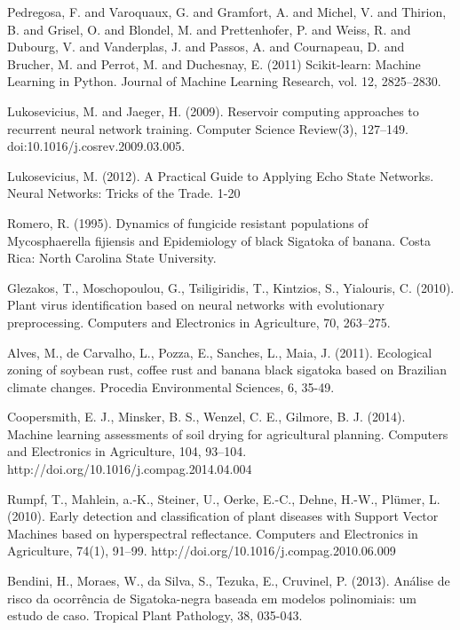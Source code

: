 \documentclass[review]{elsarticle}
\begin{document}
\begin{thebibliography}{1}
 Pedregosa, F. and Varoquaux, G. and Gramfort, A. and Michel, V. and Thirion, B. and Grisel, O. and Blondel, M. and Prettenhofer, P. and Weiss, R. and Dubourg, V. and Vanderplas, J. and Passos, A. and Cournapeau, D. and Brucher, M. and Perrot, M. and Duchesnay, E. (2011) Scikit-learn: Machine Learning in Python. Journal of Machine Learning Research, vol. 12, 2825--2830.

 Lukosevicius, M. and Jaeger, H. (2009). Reservoir computing approaches to recurrent neural network training. Computer Science Review(3), 127–149. doi:10.1016/j.cosrev.2009.03.005.

 Lukosevicius, M. (2012). A Practical Guide to Applying Echo State Networks. Neural Networks: Tricks of the Trade. 1-20

  Romero, R. (1995). Dynamics of fungicide resistant populations of Mycosphaerella fijiensis and Epidemiology of black Sigatoka of banana. Costa Rica: North Carolina State University.

 Glezakos, T., Moschopoulou, G., Tsiligiridis, T., Kintzios, S., Yialouris, C. (2010). Plant virus identification based on neural networks with evolutionary preprocessing. Computers and Electronics in Agriculture, 70, 263–275.

 Alves, M., de Carvalho, L., Pozza, E., Sanches, L., Maia, J. (2011). Ecological zoning of soybean rust, coffee rust and banana black sigatoka based on Brazilian climate changes. Procedia Environmental Sciences, 6, 35-49.

 Coopersmith, E. J., Minsker, B. S., Wenzel, C. E., Gilmore, B. J. (2014). Machine learning assessments of soil drying for agricultural planning. Computers and Electronics in Agriculture, 104, 93–104. http://doi.org/10.1016/j.compag.2014.04.004

 Rumpf, T., Mahlein, a.-K., Steiner, U., Oerke, E.-C., Dehne, H.-W., Plümer, L. (2010). Early detection and classification of plant diseases with Support Vector Machines based on hyperspectral reflectance. Computers and Electronics in Agriculture, 74(1), 91–99. http://doi.org/10.1016/j.compag.2010.06.009

 Bendini, H., Moraes, W., da Silva, S., Tezuka, E., Cruvinel, P. (2013). Análise de risco da ocorrência de Sigatoka-negra baseada em modelos polinomiais: um estudo de caso. Tropical Plant Pathology, 38, 035-043.


\end{thebibliography}
\end{document}
